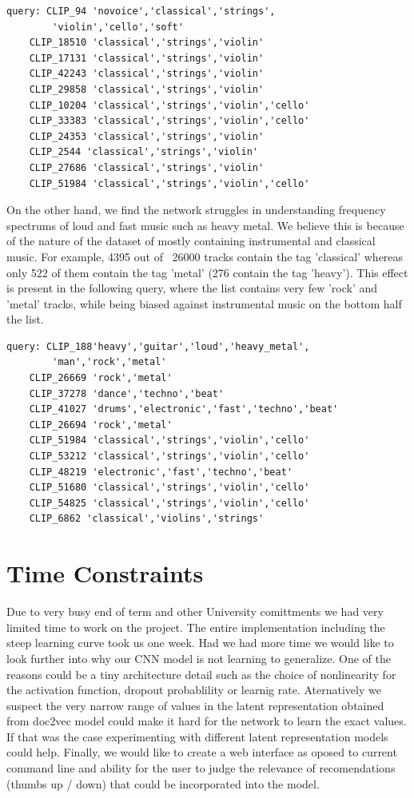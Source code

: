 \documentclass[11pt, a4paper]{article}
\begin{document}
    \begin{Verbatim}[xleftmargin=.5in]
    query: CLIP_94 'novoice','classical','strings',
        'violin','cello','soft'
    CLIP_18510 'classical','strings','violin'
    CLIP_17131 'classical','strings','violin'
    CLIP_42243 'classical','strings','violin'
    CLIP_29858 'classical','strings','violin'
    CLIP_10204 'classical','strings','violin','cello'
    CLIP_33383 'classical','strings','violin','cello'
    CLIP_24353 'classical','strings','violin'
    CLIP_2544 'classical','strings','violin'
    CLIP_27686 'classical','strings','violin'
    CLIP_51984 'classical','strings','violin','cello'
    \end{Verbatim}

    \noindent
    On the other hand, we find the network struggles in understanding frequency
    spectrums of loud and fast music such as heavy metal. We believe this is
    because of the nature of the dataset of mostly containing instrumental and
    classical music. For example, 4395 out of ~26000 tracks contain the tag
    'classical' whereas only 522 of them contain the tag 'metal' (276 contain the
    tag 'heavy'). This effect is present in the following query, where the list
    contains very few 'rock' and 'metal' tracks, while being biased against
    instrumental music on the bottom half the list.

    \begin{Verbatim}[xleftmargin=.5in]
    query: CLIP_188'heavy','guitar','loud','heavy_metal',
        'man','rock','metal'
    CLIP_26669 'rock','metal'
    CLIP_37278 'dance','techno','beat'
    CLIP_41027 'drums','electronic','fast','techno','beat'
    CLIP_26694 'rock','metal'
    CLIP_51984 'classical','strings','violin','cello'
    CLIP_53212 'classical','strings','violin','cello'
    CLIP_48219 'electronic','fast','techno','beat'
    CLIP_51680 'classical','strings','violin','cello'
    CLIP_54825 'classical','strings','violin','cello'
    CLIP_6862 'classical','violins','strings'
    \end{Verbatim}

  \section{Time Constraints}
    Due to very busy end of term and other University comittments we had very
    limited time to work on the project. The entire implementation including
    the steep learning curve took us one week. Had we had more time we would
    like to look further into why our CNN model is not learning to generalize.
    One of the reasons could be a tiny architecture detail such as the choice
    of nonlinearity for the activation function, dropout probablility or
    learnig rate. Aternatively we suspect the very narrow range of values in
    the latent representation obtained from doc2vec model could make it hard
    for the network to learn the exact values. If that was the case
    experimenting with different latent representation models could help.
    Finally, we would like to create a web interface as oposed to current
    command line and ability for the user to judge the relevance of
    recomendations (thumbs up / down) that could be incorporated into the
    model.
    
\end{document}
